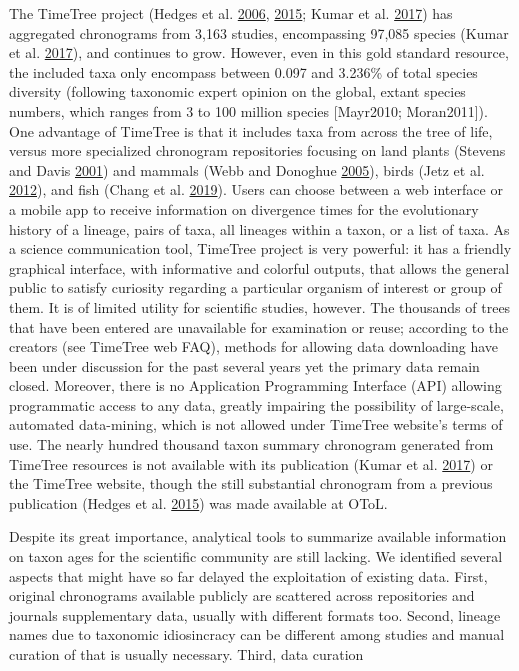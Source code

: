 \documentclass[]{article}
\begin{document}
The TimeTree project (Hedges et al. \protect\hyperlink{ref-Hedges2006}{2006}, \protect\hyperlink{ref-Hedges2015}{2015}; Kumar et al. \protect\hyperlink{ref-Kumar2017}{2017}) has aggregated chronograms
from 3,163 studies, encompassing 97,085 species (Kumar et al. \protect\hyperlink{ref-Kumar2017}{2017}), and continues to grow.
However, even in this gold standard resource, the included taxa only encompass between
0.097 and 3.236\% of total species diversity (following taxonomic expert opinion
on the global, extant species numbers, which ranges from 3 to 100 million species
{[}Mayr2010; Moran2011{]}). One advantage of TimeTree is that it includes taxa from
across the tree of life, versus more specialized chronogram repositories focusing on land plants
(Stevens and Davis \protect\hyperlink{ref-stevens2001apw}{2001}) and mammals (Webb and Donoghue \protect\hyperlink{ref-webb2005phylomatic}{2005}), birds (Jetz et al. \protect\hyperlink{ref-Jetz2012}{2012}), and fish (Chang et al. \protect\hyperlink{ref-chang2019r}{2019}). Users can choose
between a web interface or a mobile app to receive information on divergence times
for the evolutionary history of a lineage, pairs of taxa, all lineages within a
taxon, or a list of taxa. As a science communication tool, TimeTree project is
very powerful: it has a friendly graphical interface, with informative and colorful
outputs, that allows the general public to satisfy curiosity regarding a particular
organism of interest or group of them. It is of limited utility for scientific
studies, however. The thousands of trees that have been entered are unavailable
for examination or reuse; according to the creators (see TimeTree web FAQ), methods
for allowing data downloading have been under discussion for the past several years
yet the primary data remain closed. Moreover, there is no Application Programming
Interface (API) allowing programmatic access to any data, greatly impairing the
possibility of large-scale, automated data-mining, which is not allowed under TimeTree
website's terms of use. The nearly hundred thousand taxon summary chronogram generated
from TimeTree resources is not available with its publication (Kumar et al. \protect\hyperlink{ref-Kumar2017}{2017}) or the
TimeTree website, though the still substantial chronogram from a previous publication
(Hedges et al. \protect\hyperlink{ref-Hedges2015}{2015}) was made available at OToL.

Despite its great importance, analytical tools to summarize available information
on taxon ages for the scientific community are still lacking.
We identified several aspects that might have so far delayed the exploitation of
existing data. First, original chronograms available publicly are scattered across repositories
and journals supplementary data, usually with different formats too.
Second, lineage names due to taxonomic idiosincracy can be different among studies
and manual curation of that is usually necessary.
Third, data curation
\end{document}
